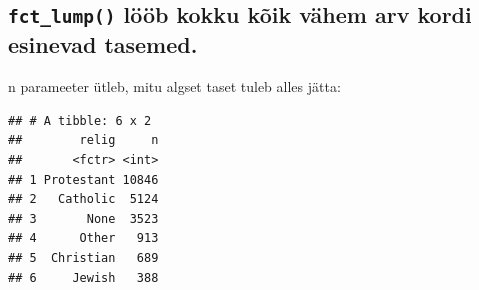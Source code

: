 \documentclass[]{book}
\newenvironment{Shaded}{\begin{snugshade}}{\end{snugshade}}
\newcommand{\KeywordTok}[1]{\textcolor[rgb]{0.13,0.29,0.53}{\textbf{#1}}}
\newcommand{\DataTypeTok}[1]{\textcolor[rgb]{0.13,0.29,0.53}{#1}}
\newcommand{\DecValTok}[1]{\textcolor[rgb]{0.00,0.00,0.81}{#1}}
\newcommand{\StringTok}[1]{\textcolor[rgb]{0.31,0.60,0.02}{#1}}
\newcommand{\OtherTok}[1]{\textcolor[rgb]{0.56,0.35,0.01}{#1}}
\newcommand{\OperatorTok}[1]{\textcolor[rgb]{0.81,0.36,0.00}{\textbf{#1}}}
\newcommand{\NormalTok}[1]{#1}
\begin{document}
\begin{Shaded}
\end{Shaded}

\subsection{\texorpdfstring{\texttt{fct\_lump()} lööb kokku kõik vähem
arv kordi esinevad
tasemed.}{fct\_lump() lööb kokku kõik vähem arv kordi esinevad tasemed.}}\label{fct_lump-loob-kokku-koik-vahem-arv-kordi-esinevad-tasemed.}

n parameeter ütleb, mitu algset taset tuleb alles jätta:

\begin{Shaded}
\end{Shaded}

\begin{verbatim}
## # A tibble: 6 x 2
##        relig     n
##       <fctr> <int>
## 1 Protestant 10846
## 2   Catholic  5124
## 3       None  3523
## 4      Other   913
## 5  Christian   689
## 6     Jewish   388
\end{verbatim}
\end{document}
